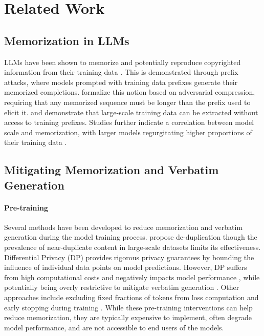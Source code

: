 \section{Related Work}

\subsection{Memorization in LLMs}
LLMs have been shown to memorize and potentially reproduce copyrighted information from their training data \citep{carlini2021extracting, carlini2022quantifying, karamolegkou2023copyright, sok_mem}.  This is demonstrated through prefix attacks, where models prompted with training data prefixes generate their memorized completions.\citet{schwarzschild2024rethinking} formalize this notion based on adversarial compression, requiring that any memorized sequence must be longer than the prefix used to elicit it. \citet{zhou2023quantifyinganalyzingentitylevelmemorization} and \citet{nasr2311scalable} demonstrate that large-scale training data can be extracted without access to training prefixes. Studies further indicate a correlation between model scale and memorization, with larger models regurgitating higher proportions of their training data \citep{carlini2022quantifying, zhou2023quantifyinganalyzingentitylevelmemorization, biderman2024emergent}.


\subsection{Mitigating Memorization and Verbatim Generation}

\paragraph{Pre-training}
Several methods have been developed to reduce memorization and verbatim generation during the model training process. \citet{kandpal2022deduplicating} propose de-duplication though the prevalence of near-duplicate content in large-scale datasets limits its effectiveness. Differential Privacy (DP) \citep{abadi2016deep} provides rigorous privacy guarantees by bounding the influence of individual data points on model predictions. However, DP suffers from high computational costs and negatively impacts model performance \citep{Anil2021}, while potentially being overly restrictive to mitigate verbatim generation \citep{elkin2023can}. Other approaches include excluding fixed fractions of tokens from loss computation \citep{hans2024like} and early stopping during training \citep{mireshghallah2022memorization, pinto2024extracting}. While these pre-training interventions can help reduce memorization, they are typically expensive to implement, often degrade model performance, and are not accessible to end users of the models.

